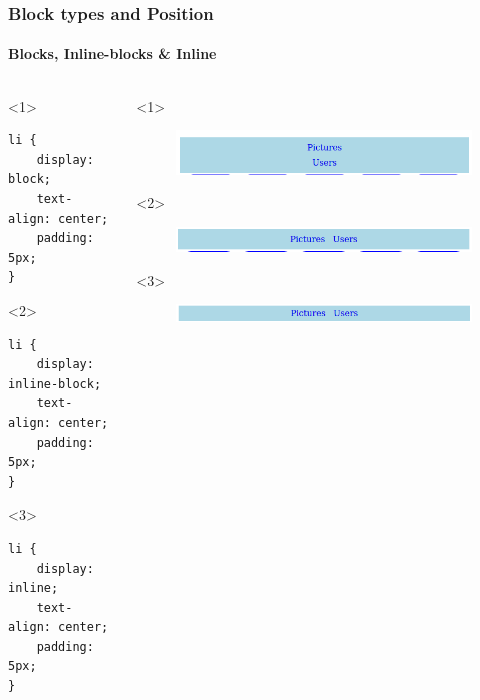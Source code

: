 \documentclass[aspectratio=169,10pt,t]{beamer}
\begin{document}
\begin{frame}[fragile]
	\frametitle{Block types and Position}
	\framesubtitle{Blocks, Inline-blocks \& Inline}

\begin{columns}
	\begin{column}{0.5\textwidth}
\begin{onlyenv}<1>
\begin{verbatim}
li {
	display: block;
	text-align: center;
	padding: 5px;
}
\end{verbatim}
	
\end{onlyenv}
\begin{onlyenv}<2>
\begin{verbatim}
li {
	display: inline-block;
	text-align: center;
	padding: 5px;
}
\end{verbatim}
	
\end{onlyenv}
\begin{onlyenv}<3>
\begin{verbatim}
li {
	display: inline;
	text-align: center;
	padding: 5px;
}
\end{verbatim}
	
\end{onlyenv}
		
	\end{column}
	\begin{column}{0.5\textwidth}
		\begin{onlyenv}<1>
			\begin{figure}[h]
				\centering
				\includegraphics[width=1\linewidth]{img/block.png}
			\end{figure}
		\end{onlyenv}

		\begin{onlyenv}<2>
			\begin{figure}[h]
				\centering
				\includegraphics[width=1\linewidth]{img/inline-block.png}
			\end{figure}
		\end{onlyenv}

		\begin{onlyenv}<3>
			\begin{figure}[h]
				\centering
				\includegraphics[width=1\linewidth]{img/inline.png}
			\end{figure}
		\end{onlyenv}

	\end{column}
\end{columns}

\end{frame}
\end{document}

